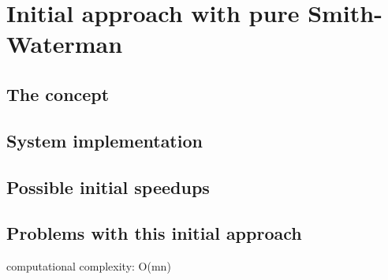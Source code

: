 
\chapter{Initial approach with pure Smith-Waterman}

\section{The concept}

\section{System implementation}

\section{Possible initial speedups}

\section{Problems with this initial approach}

computational complexity: O(mn)

